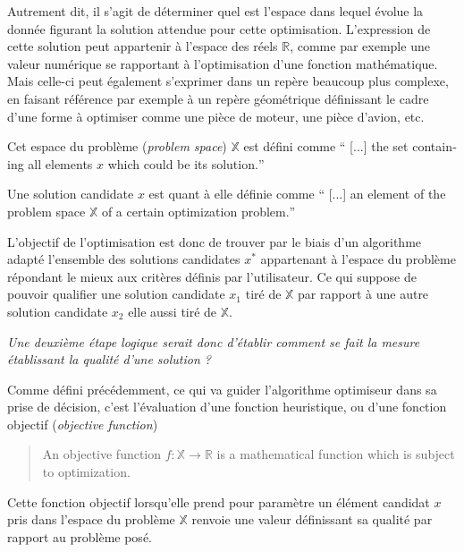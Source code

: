 Autrement dit, il s'agit de déterminer quel est l'espace dans lequel évolue la donnée figurant la solution attendue pour cette optimisation. L'expression de cette solution peut appartenir à l'espace des réels $\mathbb{R}$, comme par exemple une valeur numérique se rapportant à l'optimisation d'une fonction mathématique. Mais celle-ci peut également s'exprimer dans un repère beaucoup plus complexe, en faisant référence par exemple à un repère géométrique définissant le cadre  d'une forme à optimiser comme une pièce de moteur, une pièce d'avion, etc. \autocite[43]{Weise2011}
\medskip

Cet espace du problème (\textit{problem space}) $\mathbb{X}$ est défini comme \foreignquote{english}{ [...] the set containing all elements $x$ which could be its solution.}

\medskip

Une solution candidate $x$ est quant à elle définie comme \foreignquote{english}{ [...] an element of the problem space $ \mathbb{X}$ of a certain optimization problem.}

\medskip

L'objectif de l'optimisation est donc de trouver par le biais d'un algorithme adapté l'ensemble des solutions candidates $x^*$ appartenant à l'espace du problème répondant le mieux aux critères définis par l'utilisateur. Ce qui suppose de pouvoir qualifier une solution candidate $x_1$ tiré de $\mathbb{X}$ par rapport à une autre solution candidate $x_2$ elle aussi tiré de $\mathbb{X}$.

\medskip

\textit{Une deuxième étape logique serait donc d'établir comment se fait la mesure établissant la qualité d'une solution ?}

\medskip

Comme défini précédemment, ce qui va guider l'algorithme optimiseur dans sa prise de décision, c'est l'évaluation d'une fonction heuristique, ou d'une fonction objectif (\textit{objective function})

\medskip

\foreignblockquote{english}{An objective function $f: \mathbb{X} \to \mathbb{R}$ is a mathematical function which is subject to optimization.}

\medskip

Cette fonction objectif lorsqu'elle prend pour paramètre un élément candidat $x$ pris dans l'espace du problème $ \mathbb{X}$ renvoie une valeur définissant sa qualité par rapport au problème posé. \autocite[44]{Weise2011}

